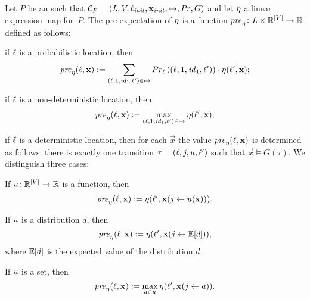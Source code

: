 \smallskip
\begin{definition}
Let $P$ be an \APP{} such that $\mathcal{C}_P = 
(\mathit{L},V,\ell_{\mathit{init}},\mathbf{x}_{\mathit{init}},\mapsto,\mathit{Pr},G)$ and let $\eta$ 
a 
linear expression map 
for~$P$. 
The 
pre-expectation of $\eta$ is a function $\mathit{pre}_{\eta}\colon \mathit{L}\times 
\mathbb{R}^{|V|} \rightarrow \mathbb{R}$ defined as follows:
\begin{compactitem} %
\item 
if $\ell$ is a probabilistic location, then
$$\mathit{pre}_{\eta}(\ell,\mathbf{x}):=\sum_{(\ell,1,\mathit{id}_1,\ell')\in\mapsto} 
Pr_{\ell}\left((\ell,1,\mathit{id}_1,\ell')\right)\cdot
 \eta(\ell',\mathbf{x});$$
\item 
 if $\ell$ is a non-deterministic location, then
$$\mathit{pre}_{\eta}(\ell,\mathbf{x}):=
\max_{(\ell,1,\mathit{id}_1,\ell')\in\mapsto}\eta(\ell',\mathbf{x});$$

\item 
if $\ell$ is a deterministic location, then for each $\vec{x}$ the value 
$\mathit{pre}_{\eta}(\ell,\mathbf{x})$ is determined as follows: there is exactly one 
transition
$\tau=(\ell,j,u,\ell')$ such that $\vec{x}\models G(\tau)$. We distinguish 
three cases:
\begin{compactitem}
\item If $u\colon \mathbb{R}^{|V|}\rightarrow \mathbb{R}$ is a function, then 
$$\mathit{pre}_{\eta}(\ell,\mathbf{x}):= \eta(\ell',\mathbf{x}(j\leftarrow u(\mathbf{x}))).$$
\item If $u$ is a distribution $d$, then $$ \mathit{pre}_{\eta}(\ell,\mathbf{x}):= 
\eta(\ell',\mathbf{x}(j\leftarrow \mathbb{E}[d])),$$ where $\mathbb{E}[d]$ is the expected value of the 
distribution $d$.
\item 
If $u$ is a set, then $$ \mathit{pre}_{\eta}(\ell,\mathbf{x}):= \max_{a\in u}
\eta(\ell',\mathbf{x}(j \leftarrow a)).$$
\end{compactitem}
\end{compactitem}
\end{definition}

